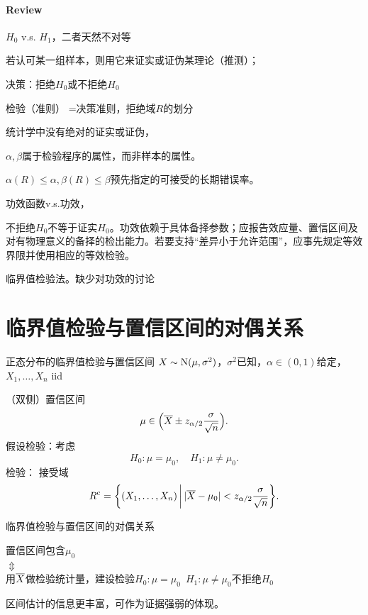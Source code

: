 \paragraph{Review}
\begin{compactenum}
	\item $H_0$ v.s. $H_1$，二者天然不对等
	
	若认可某一组样本，则用它来证实或证伪某理论（推测）；
	\item 决策：拒绝$H_0$或不拒绝$H_0$
	
	检验（准则） =决策准则，拒绝域$R$的划分
	\item 统计学中没有绝对的证实或证伪，
	
	$\alpha,\beta$属于检验程序的属性，而非样本的属性。
	
	$\alpha(R) \leqslant \alpha,\beta(R) \leqslant \beta$预先指定的可接受的长期错误率。
	\item 功效函数v.s.功效，
	
	不拒绝$H_0$不等于证实$H_0$。功效依赖于具体备择参数；应报告效应量、置信区间及对有物理意义的备择的检出能力。若要支持“差异小于允许范围”，应事先规定等效界限并使用相应的等效检验。
	\item 临界值检验法。缺少对功效的讨论
\end{compactenum}
\section{临界值检验与置信区间的对偶关系}
\begin{example}{正态分布的临界值检验与置信区间}{}
	$X \sim \operatorname{N}(\mu,\sigma^2)$，$\sigma^2$已知，$\alpha \in (0,1)$给定，$X_1,\ldots,X_n$ iid

	（双侧）置信区间
	\[
		\mu \in \Bigl(\overline{X} \pm z_{\alpha/2}\frac\sigma{\sqrt n}\Bigr).
	\]
	假设检验：考虑
	\[
		H_0:\mu = \mu_0,\quad H_1:\mu \neq \mu_0.
	\]
	检验：%
	接受域
	\[
		R^{\mathrm c} = \biggl\{(X_1,\ldots,X_n)\,\bigg\vert\,\lvert\overline{X} - \mu_0\rvert < z_{\alpha/2}\frac\sigma{\sqrt n}\biggr\}.
	\]
\end{example}
\begin{theorem}{临界值检验与置信区间的对偶关系}{}
	\begin{center}
		置信区间包含$\mu_0$\\
		$\Updownarrow$\\
		用$\overline{X}$做检验统计量，建设检验$H_0:\mu = \mu_0\enspace H_1:\mu \neq \mu_0$不拒绝$H_0$
	\end{center}
\end{theorem}
\begin{remark}
	区间估计的信息更丰富，可作为证据强弱的体现。
\end{remark}
